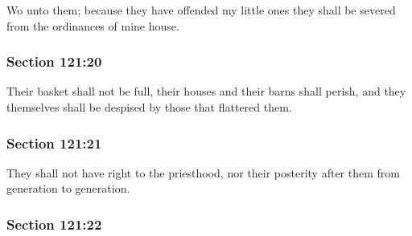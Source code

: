		Wo unto them; because they have offended my little ones they shall be severed from the ordinances of mine house.


	\subsubsection{Section 121:20} %
		\label{DC121-20}

		Their basket shall not be full, their houses and their barns shall perish, and they themselves shall be despised by those that flattered them.


	\subsubsection{Section 121:21} %
		\label{DC121-21}

		They shall not have right to the priesthood, nor their posterity after them from generation to generation.


	\subsubsection{Section 121:22} %
		\label{DC121-22}


